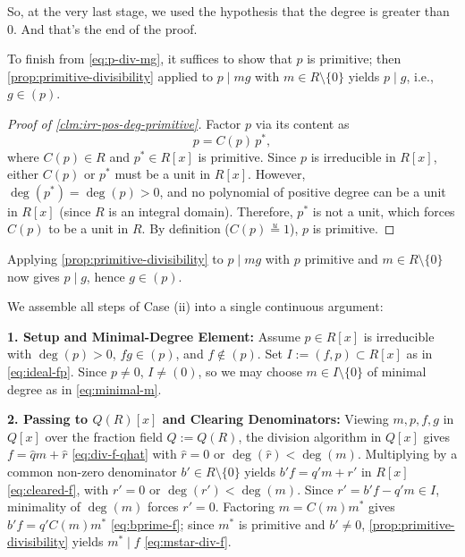 \begin{proofWrapper}
\begin{speech}[00:37:11 - 00:39:17]
So, at the very last stage, we used the hypothesis that the degree is greater than $0$. And that's the end of the proof.
\end{speech}

\begin{content}
To finish from \eqref{eq:p-div-mg}, it suffices to show that $p$ is primitive; then \cref{prop:primitive-divisibility} applied to $p \mid mg$ with $m \in R \setminus \{0\}$ yields $p \mid g$, i.e., $g \in (p)$.


\begin{proof}[Proof of \cref{clm:irr-pos-deg-primitive}]
Factor $p$ via its content as
\[
p = C(p) \, p^*,
\]
where $C(p) \in R$ and $p^* \in R[x]$ is primitive. Since $p$ is irreducible in $R[x]$, either $C(p)$ or $p^*$ must be a unit in $R[x]$. However, $\deg(p^*) = \deg(p) > 0$, and no polynomial of positive degree can be a unit in $R[x]$ (since $R$ is an integral domain). Therefore, $p^*$ is not a unit, which forces $C(p)$ to be a unit in $R$. By definition ($C(p) \stackrel{u}{=} 1$), $p$ is primitive.
\end{proof}

Applying \cref{prop:primitive-divisibility} to $p \mid mg$ with $p$ primitive and $m \in R \setminus \{0\}$ now gives $p \mid g$, hence $g \in (p)$.
\end{content}

\begin{content}
We assemble all steps of Case (ii) into a single continuous argument:

\textbf{1. Setup and Minimal-Degree Element:} Assume $p \in R[x]$ is irreducible with $\deg(p) > 0$, $fg \in (p)$, and $f \notin (p)$. Set $I := (f, p) \subset R[x]$ as in \eqref{eq:ideal-fp}. Since $p \neq 0$, $I \neq (0)$, so we may choose $m \in I \setminus \{0\}$ of minimal degree as in \eqref{eq:minimal-m}.

\textbf{2. Passing to $Q(R)[x]$ and Clearing Denominators:} Viewing $m, p, f, g$ in $Q[x]$ over the fraction field $Q := Q(R)$, the division algorithm in $Q[x]$ gives $f = \hat{q} m + \hat{r}$ \eqref{eq:div-f-qhat} with $\hat{r} = 0$ or $\deg(\hat{r}) < \deg(m)$. Multiplying by a common non-zero denominator $b' \in R \setminus \{0\}$ yields $b' f = q' m + r'$ in $R[x]$ \eqref{eq:cleared-f}, with $r' = 0$ or $\deg(r') < \deg(m)$. Since $r' = b'f - q'm \in I$, minimality of $\deg(m)$ forces $r' = 0$. Factoring $m = C(m) m^*$ gives $b' f = q' C(m) m^*$ \eqref{eq:bprime-f}; since $m^*$ is primitive and $b' \neq 0$, \cref{prop:primitive-divisibility} yields $m^* \mid f$ \eqref{eq:mstar-div-f}.


\end{content}
\end{proofWrapper}
